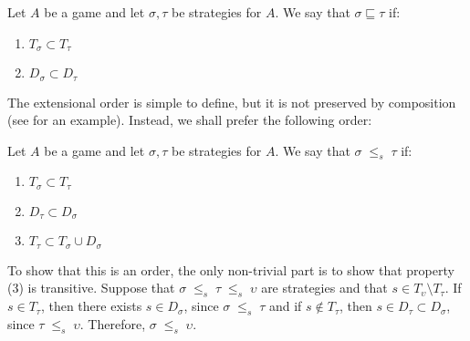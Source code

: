 \documentclass{article}
\newcommand{\stle}{{\;\le_s\;}}
\newcommand{\exle}{\sqsubseteq}
\begin{document}
\begin{definition}
  Let $A$ be a game and let $\sigma,\tau$ be strategies for $A$.  We say that $\sigma\exle\tau$ if:

  \begin{enumerate}[1)]
    \item $T_\sigma\subset T_\tau$
    \item $D_\sigma\subset D_\tau$
  \end{enumerate}
\end{definition}

The extensional order is simple to define, but it is not preserved by composition (see \cite{mcCHFiniteND} for an example).  Instead, we shall prefer the following order:

\begin{definition}
  Let $A$ be a game and let $\sigma,\tau$ be strategies for $A$.  We say that $\sigma\stle\tau$ if:

  \begin{enumerate}[1)]
    \item $T_\sigma\subset T_\tau$
    \item $D_\tau\subset D_\sigma$
    \item $T_\tau\subset T_\sigma \cup D_\sigma$
  \end{enumerate}
\end{definition}

To show that this is an order, the only non-trivial part is to show that property (3) is transitive.  Suppose that $\sigma\stle\tau\stle\upsilon$ are strategies and that $s\in T_\upsilon\setminus T_\tau$.  If $s\in T_\tau$, then there exists $s\in D_\sigma$, since $\sigma\stle\tau$ and if $s\not\in T_\tau$, then $s\in D_\tau\subset D_\sigma$, since $\tau\stle\upsilon$.  Therefore, $\sigma\stle\upsilon$.
\end{document}
